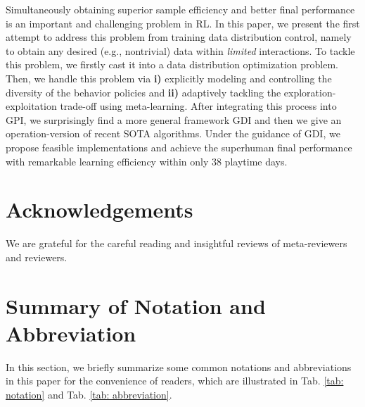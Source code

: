 Simultaneously obtaining superior sample efficiency and  better final performance is an important and challenging problem in RL. In this paper, we present the first attempt to address this problem from  training data distribution control, namely to obtain any desired (e.g., nontrivial) data within \emph{limited} interactions. To tackle this problem, we firstly cast it into a data distribution optimization problem. Then, we handle this problem via \textbf{i)} explicitly modeling and controlling the diversity  of the behavior policies and \textbf{ii)} adaptively tackling the  exploration-exploitation trade-off using meta-learning. After integrating this process into GPI, we surprisingly find a more general framework GDI and then we give an operation-version of recent SOTA algorithms. Under the guidance of GDI, we propose feasible implementations and achieve the superhuman final performance with remarkable learning efficiency within only 38 playtime days.



\section*{Acknowledgements}
We are grateful for the careful reading and insightful reviews of meta-reviewers and reviewers.



\nocite{langley00}





\newpage
\appendix
\onecolumn




\iffalse
1. 方法的核心部分其实并没有直观的写出策略多样性的定义
保证讲清楚，讲明了。明确每一个部分的具体内容和实际表现。
\fi




\section{Summary of Notation and Abbreviation}
\label{app: Abbreviation and Notation}
In this section, we briefly summarize some common notations and abbreviations in this paper for the convenience of readers, which are illustrated in Tab. \ref{tab: notation} and Tab. \ref{tab: abbreviation}.

